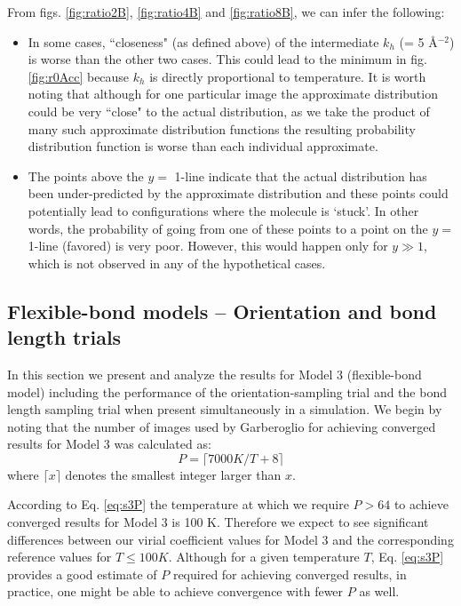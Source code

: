                 From figs. \ref{fig:ratio2B}, \ref{fig:ratio4B} and \ref{fig:ratio8B}, we can infer the following:
                \begin{itemize}
                    \item In some cases, ``closeness" (as defined above) of the intermediate $k_h$ (= 5 \AA$^{-2}$) is worse than the other two cases. This could lead to the minimum in fig. \ref{fig:r0Acc} because $k_h$ is directly proportional to temperature. It is worth noting that although for one particular image the approximate distribution could be very ``close" to the actual distribution, as we take the product of many such approximate distribution functions the resulting probability distribution function is worse than each individual approximate.
                    \item The points above the $y =$ 1-line indicate  that the actual distribution has been under-predicted by the approximate distribution and these points could potentially lead to configurations where the molecule is `stuck'. In other words, the probability of going from one of these points to a point on the $y =$ 1-line (favored) is very poor. However, this would happen only for $y \gg 1$, which is not observed in any of the hypothetical cases.
                \end{itemize}

        \subsection{Flexible-bond models -- Orientation and bond length trials}
            In this section we present and analyze the results for Model 3 (flexible-bond model) including the performance of the orientation-sampling trial and the bond length sampling trial when present simultaneously in a simulation. We begin by noting that the number of images used by Garberoglio for achieving converged results \cite{Garberoglio2014} for Model 3 was calculated as:
            \begin{equation}
            \label{eq:s3P}
                P = \lceil 7000 K/T + 8 \rceil
            \end{equation}
            where $\lceil x \rceil$ denotes the smallest integer larger than $x$.
            
            According to Eq. \eqref{eq:s3P} the temperature at which we require $P > 64$ to achieve converged results for Model 3 is 100 K. Therefore we expect to see significant differences between our virial coefficient values for Model 3 and the corresponding reference values for $T \le 100 K$. Although for a given temperature $T$, Eq. \eqref{eq:s3P} provides a good estimate of $P$ required for achieving converged results, in practice, one might be able to achieve convergence with fewer $P$ as well.

